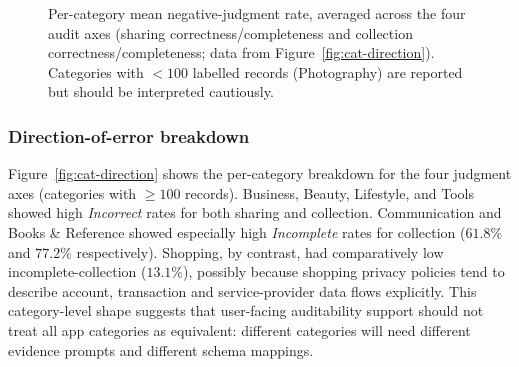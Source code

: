\documentclass[11pt,a4paper]{article}
\begin{document}
\begin{figure}[t]
\centering
{}
\caption{Per-category mean negative-judgment rate, averaged across
the four audit axes (sharing correctness/completeness and collection
correctness/completeness; data from Figure~\ref{fig:cat-direction}).
Categories with $<100$ labelled records (Photography) are reported but
should be interpreted cautiously.}
\label{fig:defect-cat}
\end{figure}

\subsubsection{Direction-of-error breakdown}
Figure~\ref{fig:cat-direction} shows the per-category breakdown for the
four judgment axes (categories with $\geq 100$ records). Business,
Beauty, Lifestyle, and Tools showed high \emph{Incorrect} rates for
both sharing and collection. Communication and Books \& Reference
showed especially high \emph{Incomplete} rates for collection
($61.8\%$ and $77.2\%$ respectively). Shopping, by contrast, had
comparatively low incomplete-collection ($13.1\%$), possibly because
shopping privacy policies tend to describe account, transaction and
service-provider data flows explicitly. This category-level shape
suggests that user-facing auditability support should not treat all
app categories as equivalent: different categories will need different
evidence prompts and different schema mappings.
\end{document}
